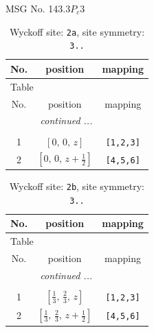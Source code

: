 \documentclass[fleqn,8pt]{jsarticle}
\begin{document}
\setcounter{MaxMatrixCols}{32}

\renewcommand{\tablename}{Table~}
\renewcommand{\figurename}{Figure~}
\begin{center}
\LARGE
MSG No. 143.3\quad$P_{c}3$
\end{center}
\renewcommand{\arraystretch}{1.2}
\begin{longtable}{ccc}
\caption{Wyckoff site: {\tt 2a}, site symmetry: {\tt 3..}}
 \\
 \hline \hline
No. & position & mapping \\ \hline \endfirsthead

\multicolumn{2}{l}{\tablename\ \thetable{}} \\
 \hline \hline
No. & position & mapping \\ \hline \endhead

 \hline \hline
\multicolumn{2}{r}{\footnotesize\it continued ...} \\ \endfoot

 \hline \hline
\multicolumn{2}{r}{} \\ \endlastfoot

1 & $\left[ 0,\, 0,\, z \right]$ & {\tt [1,2,3]} \\ \hline
2 & $\left[ 0,\, 0,\, z + \frac{1}{2} \right]$ & {\tt [4,5,6]} \\
\end{longtable}
\renewcommand{\arraystretch}{1.2}
\begin{longtable}{ccc}
\caption{Wyckoff site: {\tt 2b}, site symmetry: {\tt 3..}}
 \\
 \hline \hline
No. & position & mapping \\ \hline \endfirsthead

\multicolumn{2}{l}{\tablename\ \thetable{}} \\
 \hline \hline
No. & position & mapping \\ \hline \endhead

 \hline \hline
\multicolumn{2}{r}{\footnotesize\it continued ...} \\ \endfoot

 \hline \hline
\multicolumn{2}{r}{} \\ \endlastfoot

1 & $\left[ \frac{1}{3},\, \frac{2}{3},\, z \right]$ & {\tt [1,2,3]} \\ \hline
2 & $\left[ \frac{1}{3},\, \frac{2}{3},\, z + \frac{1}{2} \right]$ & {\tt [4,5,6]} \\
\end{longtable}
\end{document}
